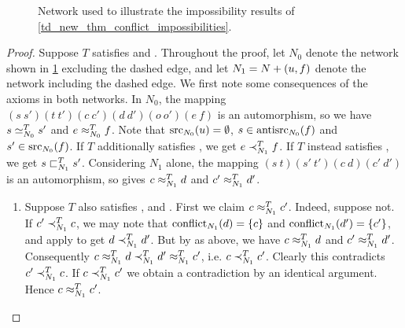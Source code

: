 \begin{figure}
    \centering
    \caption{
        Network used to illustrate the impossibility results of
        \cref{td_new_thm_conflict_impossibilities}.
    }
    \label{td_new_fig_conflict_impossibilities}
\end{figure}

\begin{proof}
    Suppose $T$ satisfies \symmetry{} and \claimcoherence{}.
    Throughout the proof, let $N_0$ denote the network shown in
    \cref{td_new_fig_conflict_impossibilities} excluding the dashed edge, and
    let $N_1 = {N} + ({u}, {f})$ denote the network including the dashed
    edge. We first note some consequences of the axioms in both networks. In
    $N_0$, the mapping $(s\ s')(t\ t')(c\ c')(d\ d')(o\ o')(e\ f)$ is an
    automorphism, so we have $s \simeq_{N_0}^T s'$ and $e \approx_{N_0}^T f$. Note
    that $\operatorname{src}_{N_0}(u) = \emptyset$, $s \in \operatorname{antisrc}_{N_0}(f)$ and $s' \in
    \operatorname{src}_{N_0}(f)$. If $T$ additionally satisfies \freshposresp{}, we get $e
    \prec_{N_1}^T f$. If $T$ instead satisfies \sourceposresp{}, we get $s
    \sqsubset_{N_1}^T s'$.
    Considering $N_1$ alone, the mapping $(s\ t)(s'\ t')(c\ d)(c'\ d')$ is an
    automorphism, so \symmetry{} gives $c \approx_{N_1}^T d$ and $c' \approx_{N_1}^T
    d'$.

    \begin{enumerate}

        \item Suppose $T$ also satisfies \freshposresp{}, \sourcecoherence{}
              and \conflictcoherence{}. First we claim $c \approx_{N_1}^T c'$.
              Indeed, suppose not. If $c' \prec_{N_1}^T c$, we may note that
              $\operatorname{conflict}_{N_1}(d) = \{c\}$ and $\operatorname{conflict}_{N_1}(d') = \{c'\}$,
              and apply \conflictcoherence{} to get $d \prec_{N_1}^T d'$. But by
              \symmetry{} as above, we have $c \approx_{N_1}^T d$ and $c'
              \approx_{N_1}^T d'$. Consequently $c \approx_{N_1}^T d \prec_{N_1}^T d'
              \approx_{N_1}^T c'$, i.e. $c \prec_{N_1}^T c'$. Clearly this
              contradicts $c' \prec_{N_1}^T c$. If $c \prec_{N_1}^T c'$ we obtain
              a contradiction by an identical argument. Hence $c \approx_{N_1}^T
              c'$.


\end{enumerate}
\end{proof}
